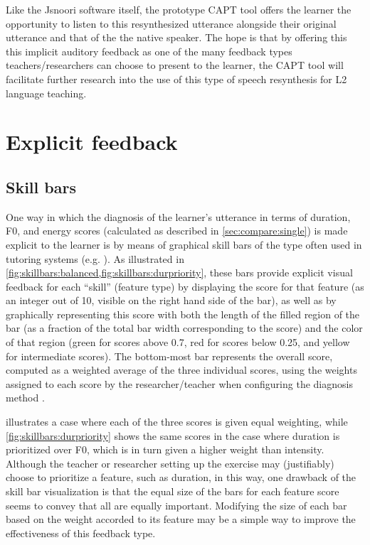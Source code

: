 			Like the Jsnoori software itself, the prototype CAPT tool offers the learner the opportunity to listen to this resynthesized utterance alongside their original utterance and that of the the native speaker. The hope is that by offering this this implicit auditory feedback as one of the many feedback types teachers/researchers can choose to present to the learner, the CAPT tool will facilitate further research into the use of this type of speech resynthesis for L2 language teaching.
			
			
	\section{Explicit feedback}
	
		\subsection{Skill bars}
		
		
		One way in which 
		the diagnosis of the learner's utterance in terms of duration, F0, and energy scores (calculated as
		described in \cref{sec:compare:single}) is made explicit to the learner is by means of graphical skill bars of the type often used in tutoring systems (e.g. \cite{Long2011,Long2013}).
		As illustrated in \cref{fig:skillbars:balanced,fig:skillbars:durpriority}, these bars provide explicit visual feedback for each ``skill'' (feature type) by displaying the score for that feature (as an integer out of 10, visible on the right hand side of the bar), as well as by graphically representing this score with both the length of the filled region of the bar (as a fraction of the total bar width corresponding to the score) and the color of that region (green for scores above 0.7, red for scores below 0.25, and yellow for intermediate scores).
		 The bottom-most bar represents the overall score, computed as a weighted average of the three individual scores, using the weights assigned to each score by the researcher/teacher when configuring the diagnosis method .
		 
		   illustrates a case where each of the three scores is given equal weighting, while \cref{fig:skillbars:durpriority} shows the same scores in the case where duration is prioritized over F0, which is in turn given a higher weight than intensity.  Although the teacher or researcher setting up the exercise may (justifiably) choose to prioritize a feature, such as duration, in this way, one drawback of the skill bar visualization is that the equal size of the bars for each feature score seems to convey that all are equally important. Modifying the size of each bar based on the weight accorded to its feature may be a simple way to improve the effectiveness of this feedback type.%
		  
